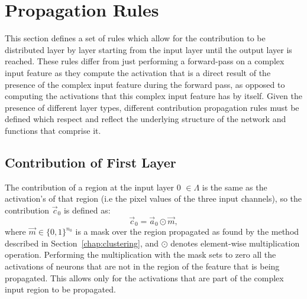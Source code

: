 \section{Propagation Rules}

This section defines a set of rules which allow for the contribution to be distributed layer by layer starting from the input layer until the output layer is reached. These rules differ from just performing a forward-pass on a complex input feature as they compute the activation that is a direct result of the presence of the complex input feature during the forward pass, as opposed to computing the activations that this complex input feature has by itself. Given the presence of different layer types, different contribution propagation rules must be defined which respect and reflect the underlying structure of the network and functions that comprise it.


\subsection{Contribution of First Layer}
The contribution of a region at the input layer 0 $\in \Lambda$ is the same as the activation's of that region (i.e the pixel values of the three input channels), so the contribution $\vec{c}_0$ is defined as:
\begin{equation*}
    \vec{c}_0 = \vec{a}_0 \odot \vec{m},
\end{equation*}
where $\vec{m}\in \{0,1\}^{n_0}$ is a mask over the region propagated as found by the method described in Section~\ref{chap:clustering}, and $\odot$ denotes element-wise multiplication operation. Performing the multiplication with the mask sets to zero all the activations of neurons that are not in the region of the feature that is being propagated. This allows only for the activations that are part of the complex input region to be propagated. 

